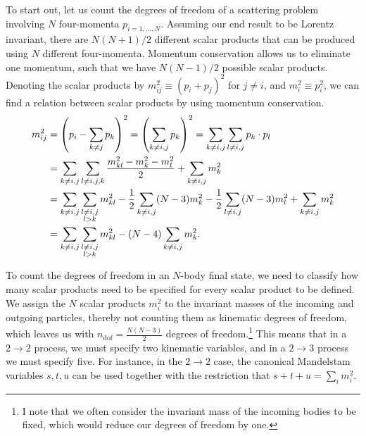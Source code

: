 \documentclass[../main.tex]{subfiles}
\begin{document}
To start out, let us count the degrees
of freedom of a scattering problem involving \(N\) four-momenta
\(p_{i=1,\ldots,N}\).
Assuming our end result to be Lorentz invariant, there are \(N(N+1)/2\) different scalar products that can be produced using \(N\) different four-momenta.
Momentum conservation allows us to eliminate one momentum, such that we have \(N(N-1)/2\) possible scalar products.
Denoting the scalar products by \(m^2_{ij} \equiv (p_i + p_j)^2\) for \(j \neq i\), and \(m^2_i \equiv p_i^2\), we can find a relation between scalar products by using momentum conservation.
\begin{align}
  \label{pc:eq:generalised_mandelstam_relation}
  \nonumber
  m^2_{ij} & = \left(p_i - \sum_{k\neq j} p_k\right)^2 =
  \left(\sum_{k\neq i,j} p_k\right)^2 = \sum_{k\neq i,j} \sum_{l\neq i,j}
  p_k\cdot
  p_l
  \\
  \nonumber
           & = \sum_{k\neq i,j} \sum_{l\neq i,j,k} \frac{m^2_{kl} - m^2_k
  - m^2_l}{2} + \sum_{k\neq i,j} m^2_k
  \\
  \nonumber
           & = \sum_{k\neq i,j} \sum_{\substack{l\neq i,j
  \\l>k}} m^2_{kl}
  - \frac{1}{2} \sum_{k\neq i, j} (N-3) m^2_k - \frac{1}{2} \sum_{l\neq
    i,j}
  (N-3) m^2_l + \sum_{k\neq i,j} m^2_k
  \\
           & = \sum_{k\neq i,j} \sum_{\substack{l\neq i,j
  \\l>k}} m^2_{kl}
  - (N-4) \sum_{k\neq i, j} m^2_k.
\end{align}

To count the degrees of freedom in an \(N\)-body final state, we need to classify how many scalar products need to be specified for every scalar product to be defined.
We assign the \(N\) scalar products \(m^2_i\) to the invariant masses of the incoming and outgoing particles, thereby not counting them as kinematic degrees of freedom, which leaves us with \(n_\text{dof} = \frac{N(N-3)}{2}\) degrees of freedom.\footnote{I note that we
  often consider the invariant mass of the incoming bodies to be fixed, which would reduce our degrees of freedom by one.}
This means that in a \(2\to 2\) process, we must specify two kinematic variables, and in a \(2\to 3\) process we must specify five.
For instance, in the \(2\to 2\) case, the canonical Mandelstam variables \(s, t, u\) can be used together with the restriction that \(s+t+u = \sum_i m_i^2\).
\end{document}
